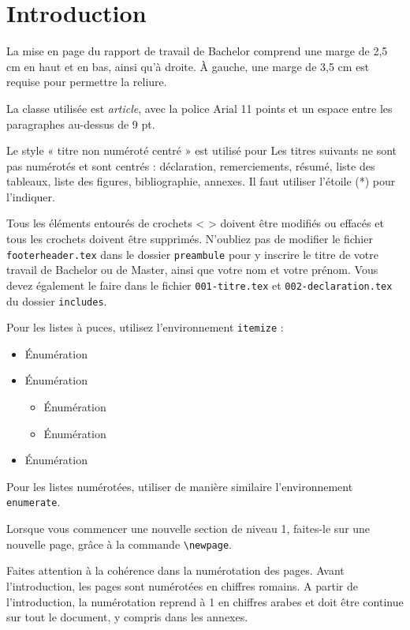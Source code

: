 \section*{Introduction}

La mise en page du rapport de travail de Bachelor comprend une marge de 2,5 cm en haut et en bas, ainsi qu’à droite. À gauche, une marge de 3,5 cm est requise pour permettre la reliure.

La classe utilisée est \emph{article}, avec la police Arial 11 points et un espace entre les paragraphes au-dessus de 9 pt.

Le style « titre non numéroté centré » est utilisé pour Les titres suivants ne sont pas numérotés et sont centrés : déclaration, remerciements, résumé, liste des tableaux, liste des figures, bibliographie, annexes. Il faut utiliser l'étoile (*) pour l'indiquer.

Tous les éléments entourés de crochets < > doivent être modifiés ou effacés et tous les crochets doivent être supprimés.
N’oubliez pas de modifier le fichier \texttt{footerheader.tex} dans le dossier \texttt{preambule} pour y inscrire le titre de votre travail de Bachelor ou de Master, ainsi que votre nom et votre prénom. Vous devez également le faire dans le fichier \texttt{001-titre.tex} et \texttt{002-declaration.tex} du dossier \texttt{includes}.

Pour les listes à puces, utilisez l'environnement \texttt{itemize} :

\begin{itemize}[itemsep=0pt]
	\item Énumération
	\item Énumération
	\begin{itemize}[itemsep=0pt]
		\item Énumération
		\item Énumération
	\end{itemize}
	\item Énumération
\end{itemize}

Pour les listes numérotées, utiliser de manière similaire l'environnement \texttt{enumerate}.

Lorsque vous commencer une nouvelle section de niveau 1, faites-le sur une nouvelle page, grâce à la commande \verb?\newpage?.

Faites attention à la cohérence dans la numérotation des pages. Avant l'introduction, les pages sont numérotées en chiffres romains. A partir de l'introduction, la numérotation reprend à 1 en chiffres arabes et doit être continue sur tout le document, y compris dans les annexes.

